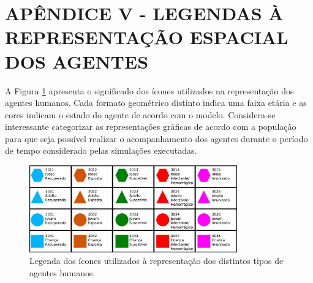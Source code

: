 \section{APÊNDICE V - LEGENDAS À REPRESENTAÇÃO ESPACIAL DOS AGENTES}

A Figura \ref{fig:legendaAgentesHumanos} apresenta o significado dos ícones utilizados na representação dos agentes humanos. Cada formato geométrico distinto indica uma faixa etária e as cores indicam o estado do agente de acordo com o modelo. Considera-se interessante categorizar as representações gráficas de acordo com a população para que seja possível realizar o acompanhamento dos agentes durante o período de tempo considerado pelas simulações executadas.

\begin{figure}[H]
  \centering
  \includegraphics[width=0.8\textwidth]{Figuras/A5/AgentesHumanos.eps}
  \caption{Legenda dos ícones utilizados à representação dos distintos tipos de agentes humanos.}
  \label{fig:legendaAgentesHumanos}
\end{figure} 

\newpage
